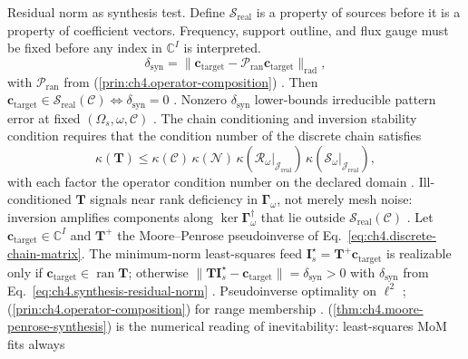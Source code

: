 Residual norm as synthesis test. Define
$\mathcal{S}_{\mathrm{real}}$ is a property of sources before it is a property of coefficient vectors. Frequency, support outline, and flux gauge must be fixed before any index in $\mathbb{C}^{I}$ is interpreted. \cite{stratton1941}
\begin{equation}
\label{eq:ch4.synthesis-residual-norm}
\delta_{\mathrm{syn}}
=
\|\mathbf{c}_{\mathrm{target}}-\mathcal{P}_{\mathrm{ran}}\mathbf{c}_{\mathrm{target}}\|_{\mathrm{rad}},
\end{equation}
with \(\mathcal{P}_{\mathrm{ran}}\) from (\ref{prin:ch4.operator-composition}) \cite{stratton1941}.
Then \(\mathbf{c}_{\mathrm{target}}\in\mathcal{S}_{\mathrm{real}}(\mathcal{C})\iff\delta_{\mathrm{syn}}=0\)
\cite{harrington2001}. Nonzero \(\delta_{\mathrm{syn}}\) lower-bounds irreducible pattern error at fixed
\((\Omega_{s},\omega,\mathcal{C})\) \cite{hansen1988}.
The chain conditioning and inversion stability condition requires that the condition number of the discrete chain satisfies
\begin{equation}
\label{eq:ch4.chain-condition-number}
\kappa(\mathbf{T})
\le
\kappa(\mathcal{C})\,\kappa(\mathcal{N})\,\kappa(\mathcal{R}_\omega|_{\mathcal{J}_{\mathrm{real}}})\,
\kappa(\mathcal{S}_\omega|_{\mathcal{J}_{\mathrm{real}}}),
\end{equation}
with each factor the operator condition number on the declared domain \cite{harrington2001}.
Ill-conditioned \(\mathbf{T}\) signals near rank deficiency in \(\boldsymbol{\Gamma}_\omega\), not merely mesh noise:
inversion amplifies components along \(\ker\boldsymbol{\Gamma}_\omega^{\dagger}\) that lie outside
\(\mathcal{S}_{\mathrm{real}}(\mathcal{C})\) \cite{hansen1988}.
\label{thm:ch4.moore-penrose-synthesis}
Let \(\mathbf{c}_{\mathrm{target}}\in\mathbb{C}^{I}\) and \(\mathbf{T}^{+}\) the Moore--Penrose pseudoinverse of
Eq.~\eqref{eq:ch4.discrete-chain-matrix}. The minimum-norm least-squares feed
\(\mathbf{I}_{s}^{\star}=\mathbf{T}^{+}\mathbf{c}_{\mathrm{target}}\) is realizable only if
\(\mathbf{c}_{\mathrm{target}}\in\operatorname{ran}\mathbf{T}\); otherwise
\(\|\mathbf{T}\mathbf{I}_{s}^{\star}-\mathbf{c}_{\mathrm{target}}\|=\delta_{\mathrm{syn}}>0\) with
\(\delta_{\mathrm{syn}}\) from Eq.~\eqref{eq:ch4.synthesis-residual-norm} \cite{harrington2001}.
Pseudoinverse optimality on \(\ell^{2}\) \cite{harrington2001}; (\ref{prin:ch4.operator-composition}) for range
membership \cite{devaney2004}.
(\ref{thm:ch4.moore-penrose-synthesis}) is the numerical reading of inevitability: least-squares MoM fits always
